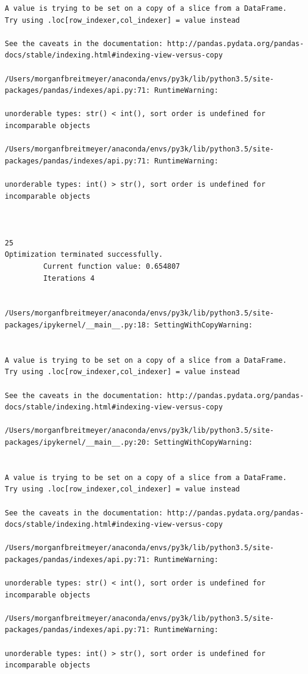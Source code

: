 \begin{lstlisting}
A value is trying to be set on a copy of a slice from a DataFrame.
Try using .loc[row_indexer,col_indexer] = value instead

See the caveats in the documentation: http://pandas.pydata.org/pandas-docs/stable/indexing.html#indexing-view-versus-copy

/Users/morganfbreitmeyer/anaconda/envs/py3k/lib/python3.5/site-packages/pandas/indexes/api.py:71: RuntimeWarning:

unorderable types: str() < int(), sort order is undefined for incomparable objects

/Users/morganfbreitmeyer/anaconda/envs/py3k/lib/python3.5/site-packages/pandas/indexes/api.py:71: RuntimeWarning:

unorderable types: int() > str(), sort order is undefined for incomparable objects



25
Optimization terminated successfully.
         Current function value: 0.654807
         Iterations 4


/Users/morganfbreitmeyer/anaconda/envs/py3k/lib/python3.5/site-packages/ipykernel/__main__.py:18: SettingWithCopyWarning:


A value is trying to be set on a copy of a slice from a DataFrame.
Try using .loc[row_indexer,col_indexer] = value instead

See the caveats in the documentation: http://pandas.pydata.org/pandas-docs/stable/indexing.html#indexing-view-versus-copy

/Users/morganfbreitmeyer/anaconda/envs/py3k/lib/python3.5/site-packages/ipykernel/__main__.py:20: SettingWithCopyWarning:


A value is trying to be set on a copy of a slice from a DataFrame.
Try using .loc[row_indexer,col_indexer] = value instead

See the caveats in the documentation: http://pandas.pydata.org/pandas-docs/stable/indexing.html#indexing-view-versus-copy

/Users/morganfbreitmeyer/anaconda/envs/py3k/lib/python3.5/site-packages/pandas/indexes/api.py:71: RuntimeWarning:

unorderable types: str() < int(), sort order is undefined for incomparable objects

/Users/morganfbreitmeyer/anaconda/envs/py3k/lib/python3.5/site-packages/pandas/indexes/api.py:71: RuntimeWarning:

unorderable types: int() > str(), sort order is undefined for incomparable objects




\end{lstlisting}
